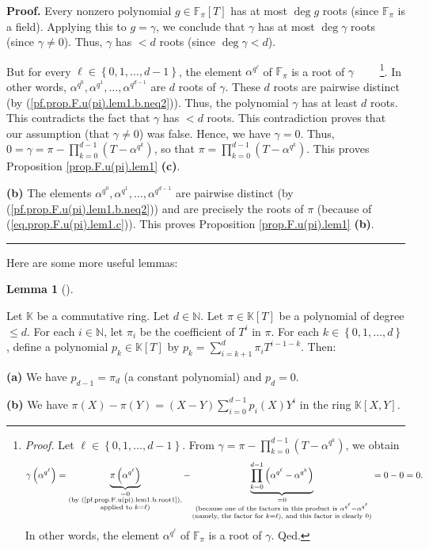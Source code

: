 \documentclass[numbers=enddot,12pt,final,onecolumn,notitlepage]{scrartcl}%
\theoremstyle{definition}
\newtheorem{lem}[theo]{Lemma}
\newenvironment{lemma}[1][]
{\begin{lem}[#1]\begin{leftbar}}
{\end{leftbar}\end{lem}}
\newenvironment{proof}[1][Proof]{\noindent\textbf{#1.} }{\ \rule{0.5em}{0.5em}}
\let\sumnonlimits\sum
\let\prodnonlimits\prod
\renewcommand{\sum}{\sumnonlimits\limits}
\renewcommand{\prod}{\prodnonlimits\limits}
\begin{document}
\begin{proof}
Every nonzero polynomial $g\in\mathbb{F}_{\pi}\left[  T\right]  $ has at most
$\deg g$ roots (since $\mathbb{F}_{\pi}$ is a field). Applying this to
$g=\gamma$, we conclude that $\gamma$ has at most $\deg\gamma$ roots (since
$\gamma\neq0$). Thus, $\gamma$ has $<d$ roots (since $\deg\gamma<d$).

But for every $\ell\in\left\{  0,1,\ldots,d-1\right\}  $, the element
$\alpha^{q^{\ell}}$ of $\mathbb{F}_{\pi}$ is a root of $\gamma$%
\ \ \ \ \footnote{\textit{Proof.} Let $\ell\in\left\{  0,1,\ldots,d-1\right\}
$. From $\gamma=\pi-\prod_{k=0}^{d-1}\left(  T-\alpha^{q^{k}}\right)  $, we
obtain%
\[
\gamma\left(  \alpha^{q^{\ell}}\right)  =\underbrace{\pi\left(  \alpha
^{q^{\ell}}\right)  }_{\substack{=0\\\text{(by
(\ref{pf.prop.F.u(pi).lem1.b.root1}),}\\\text{applied to }k=\ell\text{)}%
}}-\underbrace{\prod_{k=0}^{d-1}\left(  \alpha^{q^{\ell}}-\alpha^{q^{k}%
}\right)  }_{\substack{=0\\\text{(because one of the factors in this product
is }\alpha^{q^{\ell}}-\alpha^{q^{\ell}}\\\text{(namely, the factor for }%
k=\ell\text{), and this factor is clearly }0\text{)}}}=0-0=0.
\]
In other words, the element $\alpha^{q^{\ell}}$ of $\mathbb{F}_{\pi}$ is a
root of $\gamma$. Qed.}. In other words, $\alpha^{q^{0}},\alpha^{q^{1}}%
,\ldots,\alpha^{q^{d-1}}$ are $d$ roots of $\gamma$. These $d$ roots are
pairwise distinct (by (\ref{pf.prop.F.u(pi).lem1.b.neq2})). Thus, the
polynomial $\gamma$ has at least $d$ roots. This contradicts the fact that
$\gamma$ has $<d$ roots. This contradiction proves that our assumption (that
$\gamma\neq0$) was false. Hence, we have $\gamma=0$. Thus, $0=\gamma=\pi
-\prod_{k=0}^{d-1}\left(  T-\alpha^{q^{k}}\right)  $, so that $\pi=\prod
_{k=0}^{d-1}\left(  T-\alpha^{q^{k}}\right)  $. This proves Proposition
\ref{prop.F.u(pi).lem1} \textbf{(c)}.

\textbf{(b)} The elements $\alpha^{q^{0}},\alpha^{q^{1}},\ldots,\alpha
^{q^{d-1}}$ are pairwise distinct (by (\ref{pf.prop.F.u(pi).lem1.b.neq2})) and
are precisely the roots of $\pi$ (because of (\ref{eq.prop.F.u(pi).lem1.c})).
This proves Proposition \ref{prop.F.u(pi).lem1} \textbf{(b)}.
\end{proof}

Here are some more useful lemmas:

\begin{lemma}
\label{lem.F.u(pi).dividiff}Let $\mathbb{K}$ be a commutative ring. Let
$d\in\mathbb{N}$. Let $\pi\in\mathbb{K}\left[  T\right]  $ be a polynomial of
degree $\leq d$. For each $i\in\mathbb{N}$, let $\pi_{i}$ be the coefficient
of $T^{i}$ in $\pi$. For each $k\in\left\{  0,1,\ldots,d\right\}  $, define a
polynomial $p_{k}\in\mathbb{K}\left[  T\right]  $ by $p_{k}=\sum_{i=k+1}%
^{d}\pi_{i}T^{i-1-k}$. Then:

\textbf{(a)} We have $p_{d-1}=\pi_{d}$ (a constant polynomial) and $p_{d}=0$.

\textbf{(b)} We have $\pi\left(  X\right)  -\pi\left(  Y\right)  =\left(
X-Y\right)  \sum_{i=0}^{d-1}p_{i}\left(  X\right)  Y^{i}$ in the ring
$\mathbb{K}\left[  X,Y\right]  $.
\end{lemma}
\end{document}
